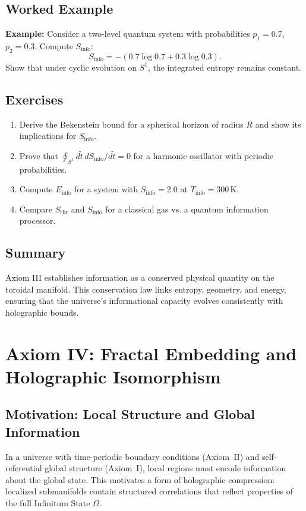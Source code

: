 \documentclass[12pt,openany]{book}
\theoremstyle{plain}
\theoremstyle{definition}
\theoremstyle{remark}
\begin{document}
\section{Worked Example}
\textbf{Example:} Consider a two-level quantum system with probabilities 
$p_1 = 0.7$, $p_2 = 0.3$. Compute $S_{\text{info}}$:
\[
S_{\text{info}} = - (0.7 \log 0.7 + 0.3 \log 0.3).
\]
Show that under cyclic evolution on $S^1$, the integrated entropy 
remains constant.

\section{Exercises}
\begin{enumerate}
    \item Derive the Bekenstein bound for a spherical horizon of radius $R$ 
    and show its implications for $S_{\text{info}}$.
    \item Prove that $\oint_{S^1} d\tilde{t} \, dS_{\text{info}}/d\tilde{t} = 0$ 
    for a harmonic oscillator with periodic probabilities.
    \item Compute $E_{\text{info}}$ for a system with $S_{\text{info}} = 2.0$ 
    at $T_{\text{info}} = 300 \, \text{K}$.
    \item Compare $S_{\text{thr}}$ and $S_{\text{info}}$ for a classical gas 
    vs. a quantum information processor.
\end{enumerate}

\section{Summary}
Axiom III establishes information as a conserved physical quantity 
on the toroidal manifold. This conservation law links entropy, 
geometry, and energy, ensuring that the universe’s informational 
capacity evolves consistently with holographic bounds.

\chapter{Axiom IV: Fractal Embedding and Holographic Isomorphism}

\section{Motivation: Local Structure and Global Information}
In a universe with time-periodic boundary conditions (Axiom~II) and
self-referential global structure (Axiom~I), local regions must encode
information about the global state. This motivates a form of holographic
compression: localized submanifolds contain structured correlations that reflect
properties of the full Infinitum State $\Omega$.
\end{document}
